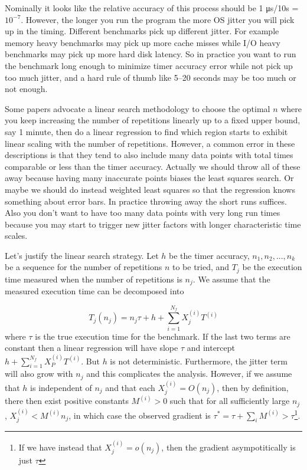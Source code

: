 \documentclass[conference]{IEEEtran}
\begin{document}
Nominally it looks like the relative accuracy of this process should be 1 μs/10s = $10^{-7}$. However, the longer you run the program the more OS jitter you will pick up in the timing. Different benchmarks pick up different jitter. For example memory heavy benchmarks may pick up more cache misses while I/O heavy benchmarks may pick up more hard disk latency. So in practice you want to run the benchmark long enough to minimize timer accuracy error while not pick up too much jitter, and a hard rule of thumb like 5--20 seconds may be too much or not enough.

Some papers
advocate a linear search methodology to choose the optimal $n$ where you keep increasing the number of repetitions linearly up to a fixed upper bound, say 1 minute, then do a linear regression to find which region starts to exhibit linear scaling with the number of repetitions. However, a common error in these descriptions is that they tend to also include many data points with total times comparable or less than the timer accuracy. Actually we should throw all of these away because having many inaccurate points biases the least squares search. Or maybe we should do instead weighted least squares so that the regression knows something about error bars. In practice throwing away the short runs suffices. Also you don't want to have too many data points with very long run times because you may start to trigger new jitter factors with longer characteristic time scales.

Let's justify the linear search strategy. Let $h$ be the timer accuracy, $n_1, n_2, ..., n_k$ be a sequence for the number of repetitions $n$ to be tried, and $T_j$ be the execution time measured when the number of repetitions is $n_j$. We assume that the measured execution time can be decomposed into

\begin{equation}
    \label{eq:linsearch}
    T_j(n_j) = n_j \tau + h + \sum_{i=1}^{N_f} X_j^{(i)} T^{(i)}
\end{equation}
%
where $\tau$ is the true execution time for the benchmark. If the last two terms
are constant then a linear regression will have slope $\tau$ and intercept $h + \sum_{i=1}^{N_f} X_P^{(i)} T^{(i)}$. But $h$ is not deterministic. Furthermore, the jitter term will also grow with $n_j$ and this complicates the analysis.
However, if we assume that $h$ is independent of $n_j$ and that each $X_j^{(i)} = O(n_j)$, then by definition, there then exist positive constants $M^{(i)} > 0$ such that for all sufficiently large $n_j$, $X_j^{(i)} < M^{(i)} n_j$, in which case the observed gradient is $\tau^* = \tau + \sum_i M^{(i)} > \tau$\footnote{If we have instead that $X_j^{(i)} = o(n_j)$, then the gradient asympotitically is just $\tau$}.
\end{document}
